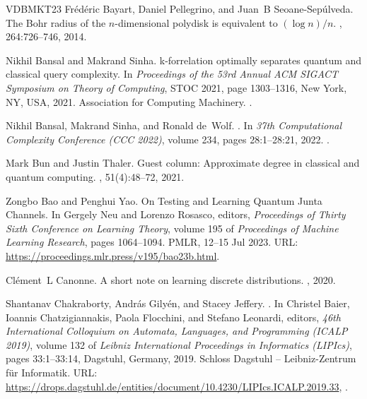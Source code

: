 \documentclass[11pt]{article}
\theoremstyle{plain}
\theoremstyle{plain}
\theoremstyle{definition}
\theoremstyle{remark}
\theoremstyle{named}
\begin{document}
\begin{thebibliography}{VDBMKT23}
Fr{\'e}d{\'e}ric Bayart, Daniel Pellegrino, and Juan~B Seoane-Sep{\'u}lveda.
\newblock The {B}ohr radius of the $n$-dimensional polydisk is equivalent to
  $(\log n)/n$.
, 264:726--746, 2014.

Nikhil Bansal and Makrand Sinha.
\newblock k-forrelation optimally separates quantum and classical query
  complexity.
\newblock In {\em Proceedings of the 53rd Annual ACM SIGACT Symposium on Theory
  of Computing}, STOC 2021, page 1303–1316, New York, NY, USA, 2021.
  Association for Computing Machinery.
\newblock \href {https://doi.org/10.1145/3406325.3451040}
  {}.

Nikhil Bansal, Makrand Sinha, and Ronald de~Wolf.
.
\newblock In {\em 37th Computational Complexity Conference (CCC 2022)}, volume
  234, pages 28:1--28:21, 2022.
\newblock \href {https://doi.org/10.4230/LIPIcs.CCC.2022.28}
  {}.

Mark Bun and Justin Thaler.
\newblock Guest column: {A}pproximate degree in classical and quantum
  computing.
, 51(4):48--72, 2021.

Zongbo Bao and Penghui Yao.
\newblock On {T}esting and {L}earning {Q}uantum {J}unta {C}hannels.
\newblock In Gergely Neu and Lorenzo Rosasco, editors, {\em Proceedings of
  Thirty Sixth Conference on Learning Theory}, volume 195 of {\em Proceedings
  of Machine Learning Research}, pages 1064--1094. PMLR, 12--15 Jul 2023.
\newblock URL: \url{https://proceedings.mlr.press/v195/bao23b.html}.

Cl{\'e}ment~L Canonne.
\newblock A short note on learning discrete distributions.
, 2020.

Shantanav Chakraborty, Andr\'{a}s Gily\'{e}n, and Stacey Jeffery.
.
\newblock In Christel Baier, Ioannis Chatzigiannakis, Paola Flocchini, and
  Stefano Leonardi, editors, {\em 46th International Colloquium on Automata,
  Languages, and Programming (ICALP 2019)}, volume 132 of {\em Leibniz
  International Proceedings in Informatics (LIPIcs)}, pages 33:1--33:14,
  Dagstuhl, Germany, 2019. Schloss Dagstuhl -- Leibniz-Zentrum f{\"u}r
  Informatik.
\newblock URL:
  \url{https://drops.dagstuhl.de/entities/document/10.4230/LIPIcs.ICALP.2019.33},
  \href {https://doi.org/10.4230/LIPIcs.ICALP.2019.33}
  {}.


\end{thebibliography}
\end{document}
